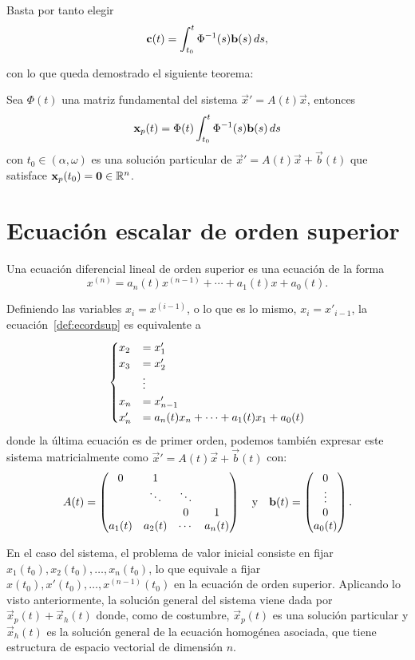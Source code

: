 \documentclass[../ecuaciones_diferenciales.tex]{subfiles}
\begin{document}
Basta por tanto elegir
\[\mathbf{c}(t) = \int_{t_0}^t \Phi^{-1}(s) \mathbf{b}(s) \mathop{d\!} s,\]

con lo que queda demostrado el siguiente teorema:

\begin{theorem}
	Sea \(\Phi(t)\) una matriz fundamental del sistema
	\(\vec{x}' = A(t)\vec{x}\), entonces
	\[\mathbf{x}_p(t) = \Phi(t) \int_{t_0}^t \Phi^{-1}(s) \mathbf{b}(s) \mathop{d\!} s\]
	con \(t_0 \in (\alpha, \omega)\) es una solución particular de
	\(\vec{x}' = A(t)\vec{x} + \vec{b}(t)\) que satisface
	\(\mathbf{x}_p(t_0) = \mathbf{0} \in \mathbb{R}^n\).
\end{theorem}

\section{Ecuación escalar de orden superior}

\begin{definition}\label{def:ecordsup}
	Una ecuación diferencial lineal de orden superior es una ecuación de la
	forma
	\[x^{(n)} = a_n(t) x^{(n - 1)} + \cdots + a_1(t)x + a_0(t).\]
\end{definition}

Definiendo las variables \(x_i = x^{(i - 1)}\), o lo que es lo mismo,
\(x_i = x'_{i - 1}\), la ecuación~\ref{def:ecordsup} es equivalente a
\[\begin{cases}
	x_2 &= x'_1 \\
	x_3 &= x'_2 \\
	&\vdots \\
	x_n &= x'_{n - 1} \\
	x'_n &= a_n(t) x_n + \cdots + a_1(t) x_1 + a_0(t)
	\end{cases}\]
donde la última ecuación es de primer orden, podemos también expresar este
sistema matricialmente como \(\vec{x}' = A(t)\vec{x} + \vec{b}(t)\) con:
\[A(t) = \begin{pmatrix}
		0 & 1 & & \\
		& \ddots & \ddots & \\
		& & 0 & 1 \\
		a_1(t) & a_2(t) & \cdots & a_n(t)
	\end{pmatrix}
	\quad \text{y} \quad
	\mathbf{b}(t) = \begin{pmatrix}0 \\ \vdots \\ 0 \\ a_0(t)\end{pmatrix}.
\]

En el caso del sistema, el problema de valor inicial consiste en fijar
\(x_1(t_0), x_2(t_0), \dots, x_n(t_0)\), lo que equivale a fijar
\(x(t_0), x'(t_0), \dots, x^{(n-1)}(t_0)\) en la ecuación de orden superior.
Aplicando lo visto anteriormente, la solución general del sistema viene dada por
\(\vec{x}_p(t) + \vec{x}_h(t)\) donde, como de costumbre, \(\vec{x}_p(t)\) es
una solución particular y \(\vec{x}_h(t)\) es la solución general de la ecuación
homogénea asociada, que tiene estructura de espacio vectorial de dimensión \(n\).
\end{document}
